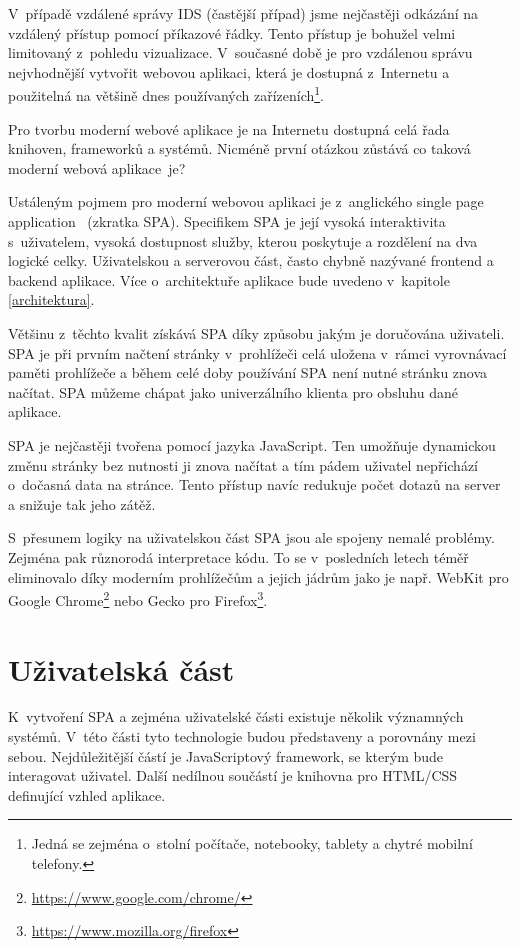 V~případě vzdálené správy IDS (častější případ) jsme nejčastěji odkázání na vzdálený přístup pomocí příkazové řádky. Tento přístup je bohužel velmi limitovaný z~pohledu vizualizace. V~současné době je pro vzdálenou správu nejvhodnější vytvořit webovou aplikaci, která je dostupná z~Internetu a použitelná na většině dnes používaných zařízeních\footnote{Jedná se zejména o~stolní počítače, notebooky, tablety a chytré mobilní telefony.}.

Pro tvorbu moderní webové aplikace je na Internetu dostupná celá řada knihoven, frameworků a systémů. Nicméně první otázkou zůstává co taková moderní webová aplikace~je?

Ustáleným pojmem pro moderní webovou aplikaci je z~anglického single page application~\cite{spa} (zkratka SPA). Specifikem SPA je její vysoká interaktivita s~uživatelem, vysoká dostupnost služby, kterou poskytuje a rozdělení na dva logické celky. Uživatelskou a serverovou část, často chybně nazývané frontend a backend aplikace. Více o~architektuře aplikace bude uvedeno v~kapitole \ref{architektura}.

Většinu z~těchto kvalit získává SPA díky způsobu jakým je doručována uživateli. SPA je při prvním načtení stránky v~prohlížeči celá uložena v~rámci vyrovnávací paměti prohlížeče a během celé doby používání SPA není nutné stránku znova načítat. SPA můžeme chápat jako univerzálního klienta pro obsluhu dané aplikace. 

SPA je nejčastěji tvořena pomocí jazyka JavaScript. Ten umožňuje dynamickou změnu stránky bez nutnosti ji znova načítat a tím pádem uživatel nepřichází o~dočasná data na stránce. Tento přístup navíc redukuje počet dotazů na server a snižuje tak jeho zátěž.

S~přesunem logiky na uživatelskou část SPA jsou ale spojeny nemalé problémy. Zejména pak různorodá interpretace kódu. To se v~posledních letech téměř eliminovalo díky moderním prohlížečům a jejich jádrům jako je např. WebKit pro Google Chrome\footnote{\url{https://www.google.com/chrome/}} nebo Gecko pro Firefox\footnote{\url{https://www.mozilla.org/firefox}}.

\section{Uživatelská část}

K~vytvoření SPA a zejména uživatelské části existuje několik významných systémů. V~této části tyto technologie budou představeny a porovnány mezi sebou. Nejdůležitější částí je JavaScriptový framework, se kterým bude interagovat uživatel. Další nedílnou součástí je knihovna pro HTML/CSS definující vzhled aplikace.

